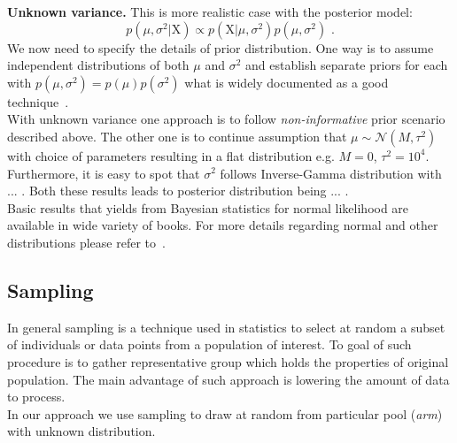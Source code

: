 \documentclass[12pt, a4paper, pdflatex, leqno]{report}
\begin{document}
\textbf{\textrm{Unknown variance. }}This is more realistic case with the posterior model:
$$
p \left(  \mu, \sigma^2 | \mathrm{X} \right) \propto p \left( \mathrm{X} | \mu, \sigma^2 \right)    p \left( \mu, \sigma^2 \right) \text{ .}
$$
We now need to specify the details of prior distribution. One way is to assume independent distributions of both $\mu$ and $\sigma^2$ and establish separate priors for each with $p(\mu, \sigma^2) = p(\mu) p(\sigma^2)$ what is widely documented as a good technique~\citep{gelman2003bayesian}.\\
With unknown variance one approach is to follow \emph{non-informative} prior scenario described above. The other one is to continue assumption that $\mu \sim \mathcal{N} \left( M, \tau^2 \right)$ with choice of parameters resulting in a flat distribution e.g. $M=0$, $\tau^2 = 10^4$. Furthermore, it is easy to spot that $\sigma^2$ follows \textrm{Inverse}-\textrm{Gamma} distribution with ... . Both these results leads to posterior distribution being ... .\\

Basic results that yields from Bayesian statistics for normal likelihood are available in wide variety of books. For more details regarding normal and other distributions please refer to~\citep{lynch2007introduction}\citep{gelman2003bayesian}.\\

\subsection{Sampling}
In general sampling is a technique used in statistics to select at random a subset of individuals or data points from a population of interest. To goal of such procedure is to gather representative group which holds the properties of original population. The main advantage of such approach is lowering the amount of data to process.\\
In our approach we use sampling to draw at random from particular pool (\emph{arm}) with unknown distribution.
\end{document}
